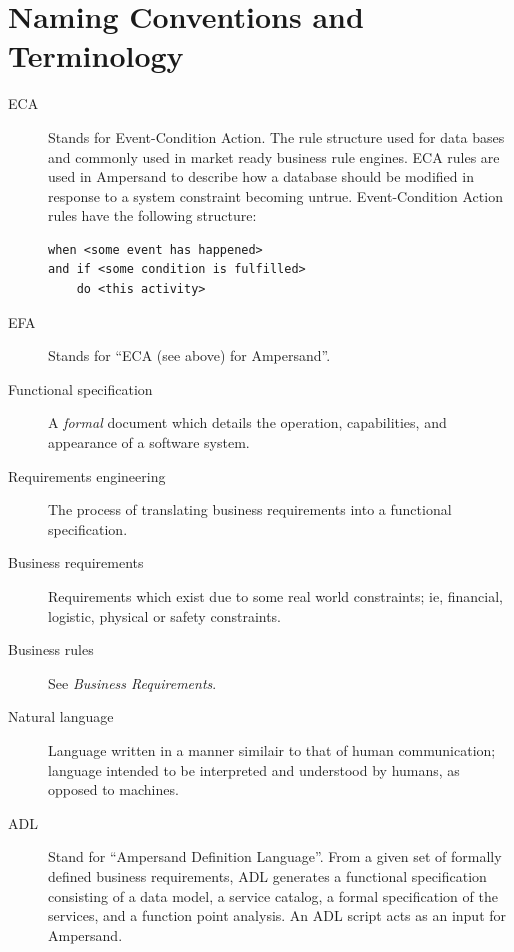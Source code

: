 \documentclass[12pt]{report}
\begin{document}
\section{Naming Conventions and Terminology}\label{sec:Naming} 
\begin{description}
\item[ECA] Stands for Event-Condition Action. The rule structure used for data
  bases and commonly used in market ready business rule engines. ECA rules are
  used in Ampersand to describe how a database should be modified in response to
  a system constraint becoming untrue. Event-Condition Action rules have
  the following structure:
\begin{verbatim}
when <some event has happened> 
and if <some condition is fulfilled> 
    do <this activity>
\end{verbatim} %
\item [EFA] Stands for ``ECA (see above) for Ampersand''.
\item [Functional specification] A \emph{formal} document which details the operation,
  capabilities, and appearance of a software system. 
\item [Requirements engineering] The process of translating business
  requirements into a functional specification. 
\item [Business requirements] Requirements which exist due to some real world constraints;
  ie, financial, logistic, physical or safety constraints. 
\item [Business rules] See \emph{Business Requirements}.
\item [Natural language] Language written in a manner similair to that of human communication; 
  language intended to be interpreted and understood by humans, as opposed to machines. 
\item [ADL] Stand for ``Ampersand Definition Language''. From a given set of
formally defined business requirements, ADL generates a functional specification
consisting of a data model, a service catalog, a formal specification of the services,
and a function point analysis. An ADL script acts as an input for Ampersand.
\end{description}
\end{document}
